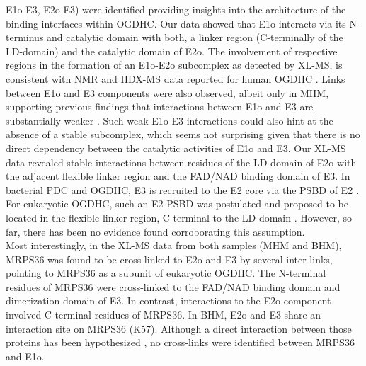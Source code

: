 \documentclass[times, twoside]{zHenriquesLab-StyleBioRxiv}
\begin{document}
E1o-E3, E2o-E3) were identified providing insights into the architecture of the binding interfaces within OGDHC. Our data showed that E1o interacts via its N-terminus and catalytic domain with both, a linker region (C-terminally of the LD-domain) and the catalytic domain of E2o. The involvement of respective regions in the formation of an E1o-E2o subcomplex as detected by XL-MS, is consistent with NMR and HDX-MS data reported for human OGDHC \cite{Zhou_2018}. Links between E1o and E3 components were also observed, albeit only in MHM, supporting previous findings that interactions between E1o and E3 are substantially weaker \cite{Zhou_2018}. Such weak E1o-E3 interactions could also hint at the absence of a stable subcomplex, which seems not surprising given that there is no direct dependency between the catalytic activities of E1o and E3. Our XL-MS data revealed stable interactions between residues of the LD-domain of E2o with the adjacent flexible linker region and the FAD/NAD binding domain of E3. In bacterial PDC and OGDHC, E3 is recruited to the E2 core via the PSBD of E2 \cite{Frank_2005, Fries_2007, Mande_1996, Perham_2000, Robien_1992}. For eukaryotic OGDHC, such an E2-PSBD was postulated and proposed to be located in the flexible linker region, C-terminal to the LD-domain \cite{Liu_2022}. However, so far, there has been no evidence found corroborating this assumption.\\ 
Most interestingly, in the XL-MS data from both samples (MHM and BHM), MRPS36 was found to be cross-linked to E2o and E3 by several inter-links, pointing to MRPS36 as a subunit of eukaryotic OGDHC. The N-terminal residues of MRPS36 were cross-linked to the FAD/NAD binding domain and dimerization domain of E3. In contrast, interactions to the E2o component involved C-terminal residues of MRPS36. In BHM, E2o and E3 share an interaction site on MRPS36 (K57). Although a direct interaction between those proteins has been hypothesized \cite{Heublein_2014}, no cross-links were identified between MRPS36 and E1o.\\
\end{document}
